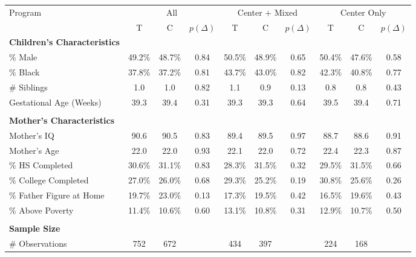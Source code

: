 \begin{tabular}{lccccccccc}
\toprule 
\midrule 
Program & \multicolumn{3}{c}{All} & \multicolumn{3}{c}{Center $+$ Mixed} & \multicolumn{3}{c}{Center Only} \\
 \cmidrule(lr){1-1} \cmidrule(lr){2-4} \cmidrule(lr){5-7} \cmidrule(lr){8-10} 
 & T & C & $p(\Delta)$ & T & C & $p(\Delta)$ & T & C & $p(\Delta)$ \\
\midrule 
\textbf{Children's Characteristics} \\
\quad \% Male & 49.2\% & 48.7\% & 0.84 & 50.5\% & 48.9\% & 0.65 & 50.4\% & 47.6\% & 0.58 \\
\quad \% Black & 37.8\% & 37.2\% & 0.81 & 43.7\% & 43.0\% & 0.82 & 42.3\% & 40.8\% & 0.77 \\
\quad \# Siblings & 1.0 & 1.0 & 0.82 & 1.1 & 0.9 & 0.13 & 0.8 & 0.8 & 0.43 \\
\quad Gestational Age (Weeks) & 39.3 & 39.4 & 0.31 & 39.3 & 39.3 & 0.64 & 39.5 & 39.4 & 0.71 \\
 \\
\textbf{Mother's Characteristics} \\
\quad Mother's IQ & 90.6 & 90.5 & 0.83 & 89.4 & 89.5 & 0.97 & 88.7 & 88.6 & 0.91 \\
\quad Mother's Age & 22.0 & 22.0 & 0.93 & 22.1 & 22.0 & 0.72 & 22.4 & 22.3 & 0.87 \\
\quad \% HS Completed & 30.6\% & 31.1\% & 0.83 & 28.3\% & 31.5\% & 0.32 & 29.5\% & 31.5\% & 0.66 \\
\quad \% College Completed & 27.0\% & 26.0\% & 0.68 & 29.3\% & 25.2\% & 0.19 & 30.8\% & 25.6\% & 0.26 \\
\quad \% Father Figure at Home & 19.7\% & 23.0\% & 0.13 & 17.3\% & 19.5\% & 0.42 & 16.5\% & 19.6\% & 0.43 \\
\quad \% Above Poverty & 11.4\% & 10.6\% & 0.60 & 13.1\% & 10.8\% & 0.31 & 12.9\% & 10.7\% & 0.50 \\
 \\
\textbf{Sample Size} \\
\quad \# Observations & 752 & 672 &  & 434 & 397 &  & 224 & 168 &  \\
\midrule 
\bottomrule 
\end{tabular}
